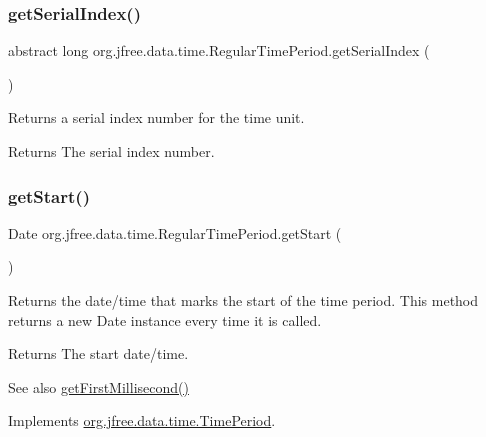 \subsubsection{\texorpdfstring{get\+Serial\+Index()}{getSerialIndex()}}
{\footnotesize\ttfamily abstract long org.\+jfree.\+data.\+time.\+Regular\+Time\+Period.\+get\+Serial\+Index (\begin{DoxyParamCaption}{ }\end{DoxyParamCaption})\hspace{0.3cm}{\ttfamily [abstract]}}

Returns a serial index number for the time unit.

\begin{DoxyReturn}{Returns}
The serial index number. 
\end{DoxyReturn}
\mbox{\label{classorg_1_1jfree_1_1data_1_1time_1_1_regular_time_period_aaa6e30c0526db40f5a63b5a9e4cf7d34}} 
\subsubsection{\texorpdfstring{get\+Start()}{getStart()}}
{\footnotesize\ttfamily Date org.\+jfree.\+data.\+time.\+Regular\+Time\+Period.\+get\+Start (\begin{DoxyParamCaption}{ }\end{DoxyParamCaption})}

Returns the date/time that marks the start of the time period. This method returns a new {\ttfamily Date} instance every time it is called.

\begin{DoxyReturn}{Returns}
The start date/time.
\end{DoxyReturn}
\begin{DoxySeeAlso}{See also}
\mbox{\hyperlink{classorg_1_1jfree_1_1data_1_1time_1_1_regular_time_period_a7aa230d10a6d78c81db0b74dce832526}{get\+First\+Millisecond()}} 
\end{DoxySeeAlso}


Implements \mbox{\hyperlink{interfaceorg_1_1jfree_1_1data_1_1time_1_1_time_period_aa8f08870c3b6b95ee24064383521e72e}{org.\+jfree.\+data.\+time.\+Time\+Period}}.

